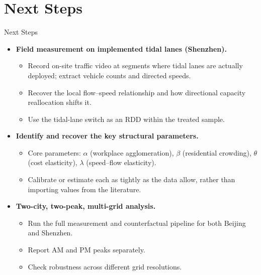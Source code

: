 \documentclass[11pt,aspectratio=169]{beamer}
\newcommand{\good}[1]{\textcolor{blue!70!black}{#1}}
\newcommand{\app}[1]{\allowbreak\hspace{0.25em}\hyperlink{#1}{\beamergotobutton{details}}}
\begin{document}
\section{Next Steps}
\begin{frame}[label=nextsteps]{Next Steps}
\small
\begin{itemize}
  \item \textbf{Field measurement on implemented tidal lanes (Shenzhen).}
  \begin{itemize}\footnotesize
    \item Record on-site traffic video at segments where tidal lanes are actually deployed; extract vehicle counts and directed speeds.
    \item Recover the local flow--speed relationship and how directional capacity reallocation shifts it.
    \item Use the tidal-lane switch as an \good{RDD} within the treated sample. \app{appfieldvisit}
  \end{itemize}
  \item \textbf{Identify and recover the key structural parameters.}
  \begin{itemize}\footnotesize
    \item Core parameters: $\alpha$ (workplace agglomeration), $\beta$ (residential crowding), $\theta$ (cost elasticity), $\lambda$ (speed--flow elasticity).
    \item Calibrate or estimate each as tightly as the data allow, rather than importing values from the literature.
  \end{itemize}
  \item \textbf{Two-city, two-peak, multi-grid analysis.}
  \begin{itemize}\footnotesize
    \item Run the full measurement and counterfactual pipeline for both \good{Beijing} and \good{Shenzhen}.
    \item Report \good{AM} and \good{PM} peaks separately.
    \item Check robustness across different grid resolutions.
  \end{itemize}
\end{itemize}
\end{frame}

\appendix
\end{document}
